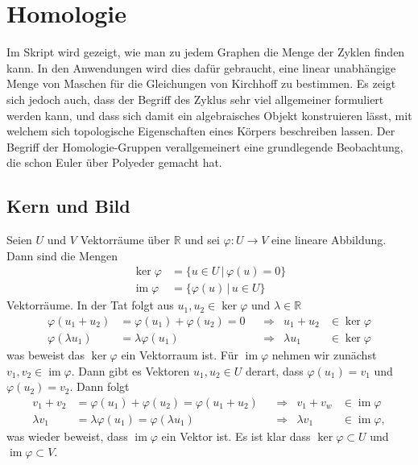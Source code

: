 %
%
%
\chapter{Homologie%
\label{chapter:homologie}}
Im Skript wird gezeigt, wie man zu jedem Graphen die Menge der Zyklen
finden kann.
In den Anwendungen wird dies dafür gebraucht, eine linear unabhängige
Menge von Maschen für die Gleichungen von Kirchhoff zu bestimmen.
Es zeigt sich jedoch auch, dass der Begriff des Zyklus sehr viel
allgemeiner formuliert werden kann, und dass sich damit ein algebraisches
Objekt konstruieren lässt, mit welchem sich topologische Eigenschaften
eines Körpers beschreiben lassen.
Der Begriff der Homologie-Gruppen verallgemeinert eine grundlegende
Beobachtung, die schon Euler über Polyeder gemacht hat.

\section{Kern und Bild}
Seien $U$ und $V$ Vektorräume über $\mathbb R$ und sei $\varphi\colon U\to V$
eine lineare Abbildung.
Dann sind die Mengen
\begin{align*}
\operatorname{ker}\varphi&=\{u\in U\,|\, \varphi(u) = 0\}
\\
\operatorname{im}\varphi&=\{\varphi(u)\,|\, u\in U\}
\end{align*}
Vektorräume.
In der Tat folgt aus $u_1,u_2\in\operatorname{ker}\varphi$
und $\lambda\in\mathbb R$
\begin{align*}
\varphi(u_1+u_2)&=\varphi(u_1)+\varphi(u_2) = 0
&
&\Rightarrow&
u_1+u_2&\in\operatorname{ker}\varphi
\\
\varphi(\lambda u_1)&=\lambda\varphi(u_1)
&
&\Rightarrow&
\lambda u_1&\in\operatorname{ker}\varphi
\end{align*}
was beweist das $\operatorname{ker}\varphi$ ein Vektorraum ist.
Für $\operatorname{im}\varphi$ nehmen wir zunächst
$v_1,v_2\in\operatorname{im}\varphi$.
Dann gibt es Vektoren $u_1,u_2\in U$ derart, dass
$\varphi(u_1)=v_1$ und $\varphi(u_2)=v_2$.
Dann folgt
\begin{align*}
v_1+v_2&=\varphi(u_1)+\varphi(u_2)=\varphi(u_1+u_2)
&
&\Rightarrow&
v_1+v_w&\in\operatorname{im}\varphi
\\
\lambda v_1&=\lambda\varphi(u_1)=\varphi(\lambda u_1)
&
&\Rightarrow&
\lambda v_1&\in\operatorname{im}\varphi,
\end{align*}
was wieder beweist, dass $\operatorname{im}\varphi$ ein Vektor ist.
Es ist klar dass $\operatorname{ker}\varphi\subset U$ und
$\operatorname{im}\varphi\subset V$.

